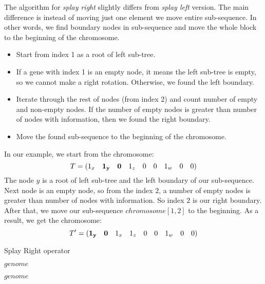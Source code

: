 \documentclass[12pt]{article}
\newlength\singleindent
\newcommand\bindent{%
  \begingroup
  \setlength{\itemindent}{\singleindent}
  \addtolength{\algorithmicindent}{\singleindent}
}
\newcommand\eindent{\endgroup}
\begin{document}
The algorithm for \textit{splay right} slightly differs from \textit{splay left} version.
The main difference is instead of moving just one element we move entire sub-sequence.
In other words, we find boundary nodes in sub-sequence and move the whole block to the beginning of the chromosome.

\begin{itemize}
\item Start from index 1 as a root of left sub-tree.
\item If a gene with index 1 is an empty node, it means the left sub-tree is empty, so we cannot make a right rotation. Otherwise, we found the left boundary.
\item Iterate through the rest of nodes (from index 2) and count number of empty and non-empty nodes.
If the number of empty nodes is greater than number of nodes with information, then we found the right boundary.
\item Move the found sub-sequence to the beginning of the chromosome.
\end{itemize}

In our example, we start from the chromosome:
\[
    T = (1_x \quad {\bf 1_y\quad 0} \quad 1_z \quad 0 \quad 0 \quad 1_w \quad 0 \quad 0)
\]
The node $y$ is a root of left sub-tree and the left boundary of our sub-sequence. Next node is an empty node, so from the index $2$, a number of empty nodes is greater than number of nodes with information. So index $2$ is our right boundary. After that, we move our sub-sequence $chromosome[1, 2]$ to the beginning. As a result, we get the chromosome:
\[
    T' = ({\bf 1_y\quad 0} \quad 1_x \quad  1_z \quad 0 \quad 0 \quad 1_w \quad 0 \quad 0)
\]


\clearpage

\begin{algorithm}
\scriptsize
\caption{Splay Right operator}
\begin{algorithmic}[]
    \bindent
                \ELSE
                \ENDIF


                    \RETURN $genome$
                \ENDIF
            \ENDFOR
        \ENDIF

        \RETURN $genome$
    \eindent
\end{algorithmic}
\end{algorithm}
\end{document}
